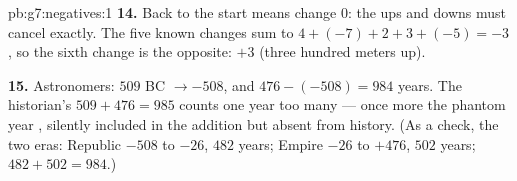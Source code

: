 \begin{solution}{pb:g7:negatives:1}
\textbf{14.} Back to the start means  change $0$: the ups and
downs must cancel exactly. The five known changes sum to
$4 + (-7) + 2 + 3 + (-5) = -3$, so the sixth change is the
opposite: $+3$ (three hundred meters up).

\textbf{15.} Astronomers: $509$ BC $\to -508$, and
$476 - (-508) = 984$ years. The historian's $509 + 476 = 985$
counts one year too many --- once more the phantom year ,
silently included in the addition but absent from history.
(As a check, the two eras: Republic $-508$ to $-26$, $482$
years; Empire $-26$ to $+476$, $502$ years;
$482 + 502 = 984$.)
\end{solution}

